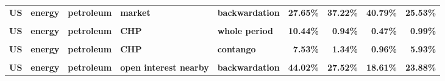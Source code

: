 \documentclass[
  authoryear,
  preprint,
  3p]{elsarticle}
\begin{document}
\begin{landscape}
\begin{longtable}[t]{>{}l>{}l>{}l>{}l>{}l>{}r>{}r>{}r>{}r}
\textbf{US} & \textbf{energy} & \textbf{petroleum} & \textbf{market} & \textbf{backwardation} & \textcolor[HTML]{4285f4}{\textbf{27.65\%}} & \textcolor[HTML]{4285f4}{\textbf{37.22\%}} & \textcolor[HTML]{4285f4}{\textbf{40.79\%}} & \textcolor[HTML]{4285f4}{\textbf{25.53\%}}\\
\textbf{\cellcolor{gray!10}{US}} & \textbf{\cellcolor{gray!10}{energy}} & \textbf{\cellcolor{gray!10}{petroleum}} & \textbf{\cellcolor{gray!10}{market}} & \textbf{\cellcolor{gray!10}{contango}} & \textcolor[HTML]{4285f4}{\textbf{\cellcolor{gray!10}{30.08\%}}} & \textcolor[HTML]{4285f4}{\textbf{\cellcolor{gray!10}{35.26\%}}} & \textcolor[HTML]{4285f4}{\textbf{\cellcolor{gray!10}{52.9\%}}} & \textcolor[HTML]{4285f4}{\textbf{\cellcolor{gray!10}{35.71\%}}}\\
\textbf{US} & \textbf{energy} & \textbf{petroleum} & \textbf{CHP} & \textbf{whole period} & \textcolor[HTML]{4285f4}{\textbf{10.44\%}} & \textcolor[HTML]{4285f4}{\textbf{0.94\%}} & \textcolor[HTML]{4285f4}{\textbf{0.47\%}} & \textcolor[HTML]{4285f4}{\textbf{0.99\%}}\\
\addlinespace
\textbf{\cellcolor{gray!10}{US}} & \textbf{\cellcolor{gray!10}{energy}} & \textbf{\cellcolor{gray!10}{petroleum}} & \textbf{\cellcolor{gray!10}{CHP}} & \textbf{\cellcolor{gray!10}{backwardation}} & \textcolor[HTML]{4285f4}{\textbf{\cellcolor{gray!10}{13.69\%}}} & \textcolor[HTML]{4285f4}{\textbf{\cellcolor{gray!10}{0.63\%}}} & \textcolor[HTML]{4285f4}{\textbf{\cellcolor{gray!10}{0.15\%}}} & \textcolor[HTML]{4285f4}{\textbf{\cellcolor{gray!10}{1.14\%}}}\\
\textbf{US} & \textbf{energy} & \textbf{petroleum} & \textbf{CHP} & \textbf{contango} & \textcolor[HTML]{4285f4}{\textbf{7.53\%}} & \textcolor[HTML]{4285f4}{\textbf{1.34\%}} & \textcolor[HTML]{4285f4}{\textbf{0.96\%}} & \textcolor[HTML]{4285f4}{\textbf{5.93\%}}\\
\textbf{\cellcolor{gray!10}{US}} & \textbf{\cellcolor{gray!10}{energy}} & \textbf{\cellcolor{gray!10}{petroleum}} & \textbf{\cellcolor{gray!10}{open interest nearby}} & \textbf{\cellcolor{gray!10}{whole period}} & \textcolor[HTML]{4285f4}{\textbf{\cellcolor{gray!10}{45.97\%}}} & \textcolor[HTML]{4285f4}{\textbf{\cellcolor{gray!10}{35.46\%}}} & \textcolor[HTML]{4285f4}{\textbf{\cellcolor{gray!10}{23.06\%}}} & \textcolor[HTML]{4285f4}{\textbf{\cellcolor{gray!10}{31.56\%}}}\\
\textbf{US} & \textbf{energy} & \textbf{petroleum} & \textbf{open interest nearby} & \textbf{backwardation} & \textcolor[HTML]{4285f4}{\textbf{44.02\%}} & \textcolor[HTML]{4285f4}{\textbf{27.52\%}} & \textcolor[HTML]{4285f4}{\textbf{18.61\%}} & \textcolor[HTML]{4285f4}{\textbf{23.88\%}}\\

\end{longtable}
\end{landscape}
\end{document}
